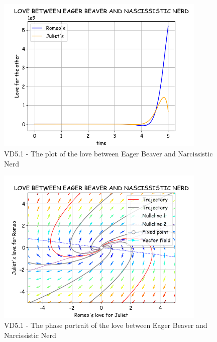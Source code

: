 \begin{figure}[!htbp]
    \centering
    \includegraphics[width=100mm]{image/bt2/plot5.1.png}
    \caption{VD5.1 - The plot of the love between Eager Beaver and Narcissistic Nerd}
\end{figure}
\begin{figure}[!htbp]
    \centering
    \includegraphics[width=100mm]{image/bt2/pp5.1.png}
    \caption{VD5.1 - The phase portrait of the love between Eager Beaver and Narcissistic Nerd}
\end{figure}

